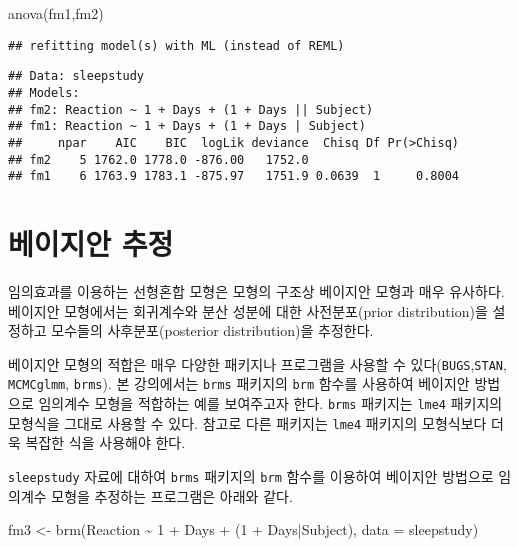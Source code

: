 \documentclass[
]{book}
\newenvironment{Shaded}{\begin{snugshade}}{\end{snugshade}}
\newcommand{\AttributeTok}[1]{\textcolor[rgb]{0.77,0.63,0.00}{#1}}
\newcommand{\DecValTok}[1]{\textcolor[rgb]{0.00,0.00,0.81}{#1}}
\newcommand{\FunctionTok}[1]{\textcolor[rgb]{0.00,0.00,0.00}{#1}}
\newcommand{\NormalTok}[1]{#1}
\newcommand{\OtherTok}[1]{\textcolor[rgb]{0.56,0.35,0.01}{#1}}
\newcommand{\SpecialCharTok}[1]{\textcolor[rgb]{0.00,0.00,0.00}{#1}}
\begin{document}
\begin{Shaded}
\begin{Highlighting}[]
\FunctionTok{anova}\NormalTok{(fm1,fm2)}
\end{Highlighting}
\end{Shaded}

\begin{verbatim}
## refitting model(s) with ML (instead of REML)
\end{verbatim}

\begin{verbatim}
## Data: sleepstudy
## Models:
## fm2: Reaction ~ 1 + Days + (1 + Days || Subject)
## fm1: Reaction ~ 1 + Days + (1 + Days | Subject)
##     npar    AIC    BIC  logLik deviance  Chisq Df Pr(>Chisq)
## fm2    5 1762.0 1778.0 -876.00   1752.0                     
## fm1    6 1763.9 1783.1 -875.97   1751.9 0.0639  1     0.8004
\end{verbatim}

\hypertarget{uxbca0uxc774uxc9c0uxc548-uxcd94uxc815}{%
\section{베이지안 추정}\label{uxbca0uxc774uxc9c0uxc548-uxcd94uxc815}}

임의효과를 이용하는 선형혼합 모형은 모형의 구조상 베이지안 모형과 매우 유사하다. 베이지안 모형에서는 회귀계수와 분산 성분에 대한 사전분포(prior distribution)을 설정하고 모수들의 사후분포(posterior distribution)을 추정한다.

베이지안 모형의 적합은 매우 다양한 패키지나 프로그램을 사용할 수 있다(\texttt{BUGS},\texttt{STAN}, \texttt{MCMCglmm}, \texttt{brms}). 본 강의에서는 \texttt{brms} 패키지의 \texttt{brm} 함수를 사용하여 베이지안 방법으로 임의계수 모형을 적합하는 예를 보여주고자 한다. \texttt{brms} 패키지는 \texttt{lme4} 패키지의 모형식을 그대로 사용할 수 있다. 참고로 다른 패키지는 \texttt{lme4} 패키지의 모형식보다 더욱 복잡한 식을 사용해야 한다.

\texttt{sleepstudy} 자료에 대하여 \texttt{brms} 패키지의 \texttt{brm} 함수를 이용하여 베이지안 방법으로 임의계수 모형을 추정하는 프로그램은 아래와 같다.

\begin{Shaded}
\begin{Highlighting}[]
\NormalTok{fm3 }\OtherTok{\textless{}{-}} \FunctionTok{brm}\NormalTok{(Reaction }\SpecialCharTok{\textasciitilde{}} \DecValTok{1} \SpecialCharTok{+}\NormalTok{ Days }\SpecialCharTok{+}\NormalTok{ (}\DecValTok{1} \SpecialCharTok{+}\NormalTok{ Days}\SpecialCharTok{|}\NormalTok{Subject), }\AttributeTok{data =}\NormalTok{ sleepstudy)}
\end{Highlighting}
\end{Shaded}
\end{document}
